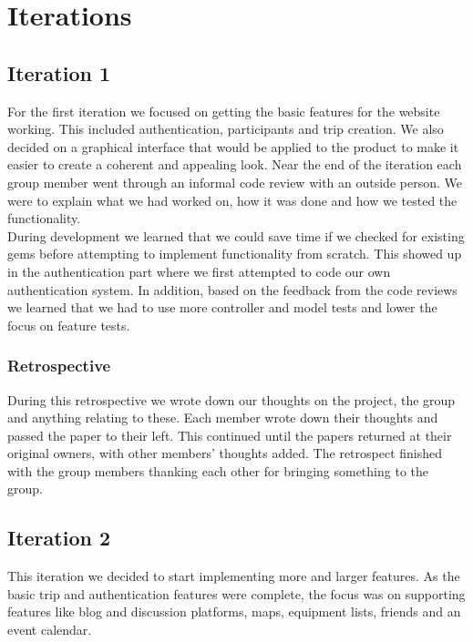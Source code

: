 \documentclass[a4paper]{article}
\begin{document}
\section{Iterations}
\subsection{Iteration 1}
For the first iteration we focused on getting the basic features for the website working. This included authentication, participants and trip creation. We also decided on a graphical interface that would be applied to the product to make it easier to create a coherent and appealing look. Near the end of the iteration each group member went through an informal code review with an outside person. We were to explain what we had worked on, how it was done and how we tested the functionality.\\

\noindent
During development we learned that we could save time if we checked for existing gems before attempting to implement functionality from scratch. This showed up in the authentication part where we first attempted to code our own authentication system. In addition, based on the feedback from the code reviews we learned that we had to use more controller and model tests and lower the focus on feature tests.

\subsubsection{Retrospective}
During this retrospective we wrote down our thoughts on the project, the group and anything relating to these. Each member wrote down their thoughts and passed the paper to their left. This continued until the papers returned at their original owners, with other members' thoughts added. The retrospect finished with the group members thanking each other for bringing something to the group.

\subsection{Iteration 2}
This iteration we decided to start implementing more and larger features. As the basic trip and authentication features were complete, the focus was on supporting features like blog and discussion platforms, maps, equipment lists, friends and an event calendar.
\end{document}
